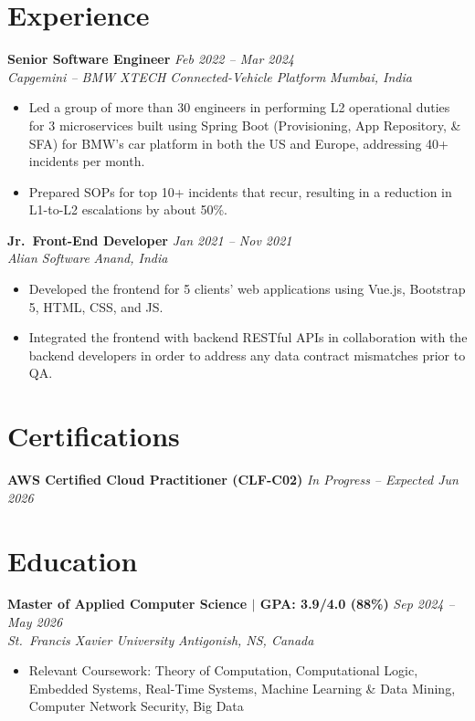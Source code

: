\documentclass[10pt, letterpaper]{article}
\newcommand{\resumeItem}[1]{\item\small{#1}}
\newcommand{\resumeSubheading}[4]{
  \textbf{#1} \hfill \textit{\small #2} \\
  \textit{\small #3} \hfill \textit{\small #4}
}
\begin{document}
\vspace{1pt}

\section{Experience}

\resumeSubheading{Senior Software Engineer}{Feb 2022 -- Mar 2024}{Capgemini -- BMW XTECH Connected-Vehicle Platform}{Mumbai, India}
\begin{itemize}[leftmargin=1.5em, itemsep=0pt, topsep=2pt]
  \resumeItem{Led a group of more than 30 engineers in performing L2 operational duties for 3 microservices built using Spring Boot (Provisioning, App Repository, \& SFA) for BMW’s car platform in both the US and Europe, addressing 40+ incidents per month.}
  \resumeItem{Prepared SOPs for top 10+ incidents that recur, resulting in a reduction in L1-to-L2 escalations by about 50\%.}
\end{itemize}

\vspace{3pt}

\resumeSubheading{Jr.\ Front-End Developer}{Jan 2021 -- Nov 2021}{Alian Software}{Anand, India}
\begin{itemize}[leftmargin=1.5em, itemsep=0pt, topsep=2pt]
  \resumeItem{Developed the frontend for 5 clients’ web applications using Vue.js, Bootstrap 5, HTML, CSS, and JS.}
  \resumeItem{Integrated the frontend with backend RESTful APIs in collaboration with the backend developers in order to address any data contract mismatches prior to QA.}
\end{itemize}

\vspace{1pt}

\section{Certifications}
\small
\textbf{AWS Certified Cloud Practitioner (CLF-C02)} \hfill \textit{In Progress -- Expected Jun 2026}

\vspace{1pt}

\section{Education}

\resumeSubheading{Master of Applied Computer Science $|$ GPA: 3.9/4.0 (88\%)}{Sep 2024 -- May 2026}{St.\ Francis Xavier University}{Antigonish, NS, Canada}
\begin{itemize}[leftmargin=1.5em, itemsep=0pt, topsep=2pt]
  \resumeItem{Relevant Coursework: Theory of Computation, Computational Logic, Embedded Systems, Real-Time Systems, Machine Learning \& Data Mining, Computer Network Security, Big Data}
\end{itemize}
\end{document}

